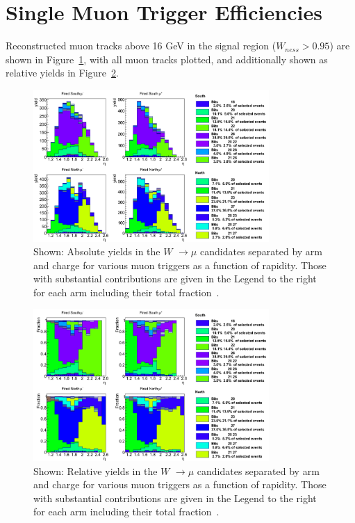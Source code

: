 \clearpage
\section{Single Muon Trigger Efficiencies}
Reconstructed muon tracks above 16 GeV in the signal region ($W_{ness} > 0.95$)
are shown in Figure~\ref{fig:triggerstack_all}, with all muon tracks plotted,
and additionally shown as relative yields in
Figure~\ref{fig:triggerrel_all}.

\begin{figure}[ht]
  \centering
  \includegraphics[width=0.8\textwidth]{./figures/triggerstack13_all.png}
  \caption{
    Shown: Absolute yields in the $W$ $\rightarrow \mu$ candidates separated by
    arm and charge for various muon triggers as a function of rapidity. Those
    with substantial contributions are given in the Legend to the right for each
    arm including their total fraction~\cite{Seidl2014}.
  }
  \label{fig:triggerstack_all} 
\end{figure}

\begin{figure}[ht]
  \centering
  \includegraphics[width=0.8\textwidth]{./figures/triggerrel13_all.png}
  \caption{
    Shown: Relative yields in the $W$ $\rightarrow \mu$ candidates separated by
    arm and charge for various muon triggers as a function of rapidity. Those
    with substantial contributions are given in the Legend to the right for each
    arm including their total fraction~\cite{Seidl2014}.
  }
  \label{fig:triggerrel_all} 
\end{figure}

